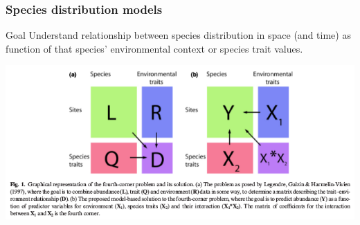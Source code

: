 \documentclass{beamer}
\begin{document}
\begin{frame}
  \frametitle{Species distribution models}

  \begin{block}{Goal}
    Understand relationship between species distribution in space (and time) as function of that species' environmental context or species trait values.
  \end{block}

  \begin{center}
    \includegraphics[width = \textwidth,height = 0.5\textheight,keepaspectratio = true]{figure/brown_fourth_corner}
  \end{center}

  \footnotesize{}
\end{frame}
\end{document}
